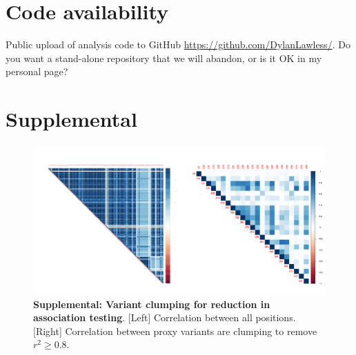 \documentclass{article} %
\newcommand{\beginsupplement}{%
        \setcounter{table}{0}
        \renewcommand{\thetable}{S\arabic{table}}%
        \setcounter{figure}{0}
        \renewcommand{\thefigure}{S\arabic{figure}}%
     }
\begin{document}
\section{Code availability}
Public upload of analysis code to GitHub \url{https://github.com/DylanLawless/}.
Do you want a stand-alone repository that we will abandon, or is it OK in my personal page?





\beginsupplement
\section{Supplemental}
 \label{sec:Supplemental_text}
									
\begin{figure}[ht] \hspace{-0.5cm} 
    \includegraphics[scale=0.85]{S1}
	\caption{\textbf{Supplemental: Variant clumping for reduction in association testing}. [Left] Correlation between all positions. [Right] Correlation between proxy variants are clumping to remove $r^2 \ge 0.8$.}
	\label{fig:S1}
\end{figure}
\end{document}
